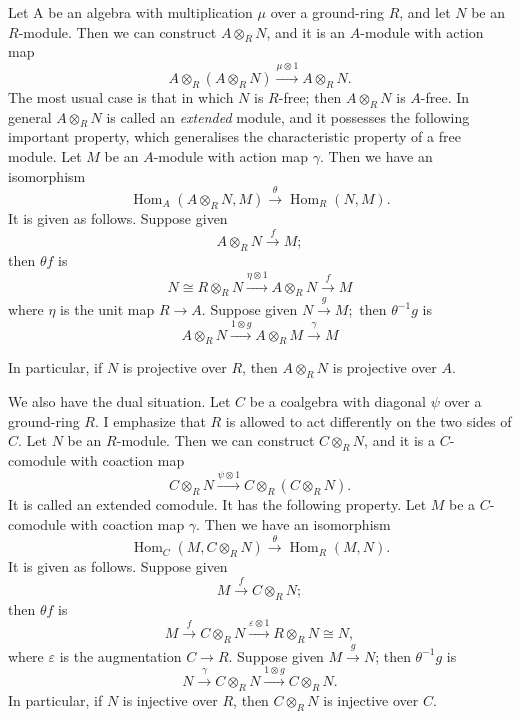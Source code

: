 \documentclass[../main]{subfiles}
\begin{document}
\par Let A be an algebra with multiplication $\mu$ over a ground-ring $R$, and let $N$ be an $R$-module. Then we can construct $A\otimes_R N$, and it is an $A$-module with action map 
$$A\otimes_R(A\otimes_R N)\overset{\mu\otimes 1}{\longrightarrow} A\otimes_R N.$$
The most usual case is that in which $N$ is $R$-free; then $A\otimes_R N$ is $A$-free. In general $A\otimes_R N$ is called an \emph{extended} module, and it possesses the following important property, which generalises the characteristic property of a free module. Let $M$ be an $A$-module with action map $\gamma$. Then we have an isomorphism
$$\operatorname{Hom}_A(A\otimes_R N, M)\overset{\theta}{\longrightarrow}\operatorname{Hom}_R(N,M).$$
It is given as follows. Suppose given
$$A\otimes_R N\overset{f}{\longrightarrow} M;$$
then $\theta f$ is
$$N\cong R\otimes_R N\overset{\eta\otimes 1}{\longrightarrow} A\otimes_R N\overset{f}{\longrightarrow}M$$
where $\eta$ is the unit map $R\longrightarrow A$. Suppose given $N\overset{g}{\longrightarrow} M;$ then $\theta^{-1}g$ is
$$A\otimes_R N\overset{1\otimes g}{\longrightarrow} A\otimes_R M\overset{\gamma}{\longrightarrow} M$$

In particular, if $N$ is projective over $R$, then $A\otimes_R N$ is projective over $A$.

\par We also have the dual situation. Let $C$ be a coalgebra with diagonal $\psi$ over a ground-ring $R$. I emphasize that $R$ is allowed to act differently on the two sides of $C$. Let $N$ be an $R$-module. Then we can construct $C\otimes_R N$, and it is a $C$-comodule with coaction map
$$C\otimes_R N \overset{\psi\otimes 1}{\longrightarrow} C\otimes_R (C\otimes_R N).$$
It is called an extended comodule. It has the following property. Let $M$ be a $C$-comodule with coaction map $\gamma$. Then we have an isomorphism
$$\operatorname{Hom}_C(M,C\otimes_R N)\overset{\theta}{\longrightarrow} \operatorname{Hom}_R(M,N).$$
It is given as follows. Suppose given
$$M\overset{f}{\longrightarrow}C\otimes_R N;$$
then $\theta f$ is
$$M\overset{f}{\longrightarrow}C\otimes_R N\overset{\varepsilon \otimes 1}{\longrightarrow} R\otimes_R N\cong N,$$
where $\varepsilon$ is the augmentation $C\longrightarrow R$. Suppose given $M\overset{g}{\longrightarrow} N$; then $\theta^{-1}g$ is 
$$N\overset{\gamma}{\longrightarrow} C\otimes_R N \overset{1\otimes g}{\longrightarrow} C\otimes_R N.$$
In particular, if $N$ is injective over $R$, then $C\otimes_R N$ is injective over $C$.
\end{document}
